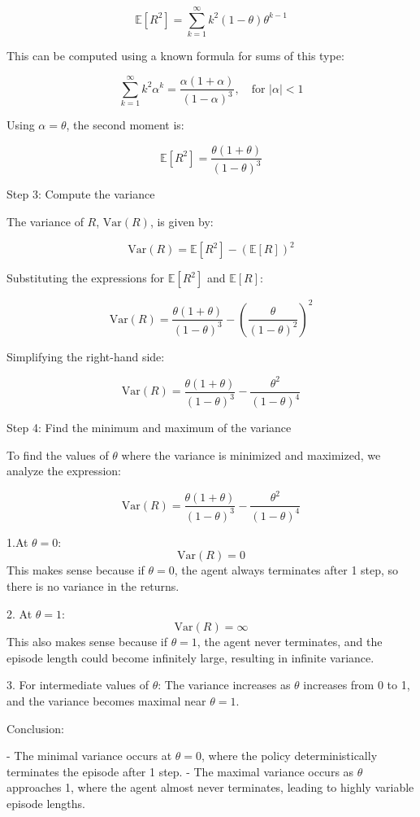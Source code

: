 \documentclass{article}
\begin{document}
\begin{enumerate}
\[
\mathbb{E}[R^2] = \sum_{k=1}^{\infty} k^2 (1 - \theta) \theta^{k-1}
\]

This can be computed using a known formula for sums of this type:

\[
\sum_{k=1}^{\infty} k^2 \alpha^k = \frac{\alpha(1 + \alpha)}{(1 - \alpha)^3}, \quad \text{for } |\alpha| < 1
\]

Using \( \alpha = \theta \), the second moment is:

\[
\mathbb{E}[R^2] = \frac{\theta(1 + \theta)}{(1 - \theta)^3}
\]

Step 3: Compute the variance

The variance of \( R \), \( \text{Var}(R) \), is given by:

\[
\text{Var}(R) = \mathbb{E}[R^2] - (\mathbb{E}[R])^2
\]

Substituting the expressions for \( \mathbb{E}[R^2] \) and \( \mathbb{E}[R] \):

\[
\text{Var}(R) = \frac{\theta(1 + \theta)}{(1 - \theta)^3} - \left( \frac{\theta}{(1 - \theta)^2} \right)^2
\]

Simplifying the right-hand side:

\[
\text{Var}(R) = \frac{\theta(1 + \theta)}{(1 - \theta)^3} - \frac{\theta^2}{(1 - \theta)^4}
\]

Step 4: Find the minimum and maximum of the variance

To find the values of \( \theta \) where the variance is minimized and maximized, we analyze the expression:

\[
\text{Var}(R) = \frac{\theta(1 + \theta)}{(1 - \theta)^3} - \frac{\theta^2}{(1 - \theta)^4}
\]

1.At \( \theta = 0 \):
\[
\text{Var}(R) = 0
\]
This makes sense because if \( \theta = 0 \), the agent always terminates after 1 step, so there is no variance in the returns.

2. At \( \theta = 1 \):
\[
\text{Var}(R) = \infty
\]
This also makes sense because if \( \theta = 1 \), the agent never terminates, and the episode length could become infinitely large, resulting in infinite variance.

3. For intermediate values of \( \theta \):
The variance increases as \( \theta \) increases from 0 to 1, and the variance becomes maximal near \( \theta = 1 \).

Conclusion:

- The minimal variance occurs at \( \theta = 0 \), where the policy deterministically terminates the episode after 1 step.
- The maximal variance occurs as \( \theta \) approaches 1, where the agent almost never terminates, leading to highly variable episode lengths.




\end{enumerate}
\end{document}

